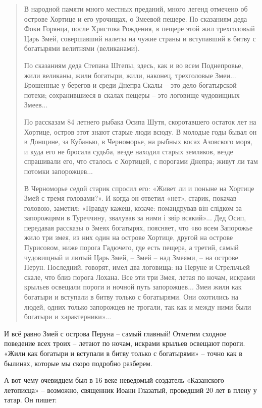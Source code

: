 \begin{quotation}
В народной памяти много местных преданий, много легенд отмечено об острове Хортице и его урочищах, о Змеевой пещере. По сказаниям деда Фоки Горянца, после Христова Рождения, в пещере этой жил трехголовый Царь Змей, совершавший налеты на чужие страны и вступавший в битву с богатырями велитнями (великанами). 

По сказаниям деда Степана Штепы, здесь, как и во всем Поднепровье, жили великаны, жили богатыри, жили, наконец, трехголовые Змеи... Брошенные у берегов и среди Днепра Скалы – это дело богатырской потехи; сохранившиеся в скалах пещеры – это логовище чудовищных Змеев...

По рассказам 84 летнего рыбака Осипа Шутя, скоротавшего остаток лет на Хортице, остров этот знают старые люди всюду. В молодые годы бывал он в Донщине, за Кубанью, в Черноморье, на рыбных косах Азовского моря, и куда его не бросала судьба, везде находил старых земляков, везде спрашивали его, что сталось с Хортицей, с порогами Днепра; живут ли там потомки запорожцев...

В Черноморье седой старик спросил его: «Живет ли и поныне на Хортице Змей с тремя головами?». И когда он ответил «нет», старик, покачав головою, заметил: «Правду кажеш, козаче: помандрував він слідком за запорожцями в Туреччину, звалував за ними і звір всякий»... Дед Осип, передавая рассказы о Змеях богатырях, поясняет, что «во всем Запорожье жило три змея, из них один на острове Хортице, другой на острове Пурисовом, ниже порога Гадючего, где есть пещера, а третий, самый чудовищный и лютый Царь Змей, – Змей – над Змеями, – на острове Перун. Последний, говорят, имел два логовища: на Перуне и Стрельчьей скале, что близ порога Лохана. Все эти три Змея, летая по ночам, искрами крыльев освещали пороги и ночной путь запорожцев... Змеи жили как богатыри и вступали в битву только с богатырями. Они охотились на людей, одних только запорожцев не трогали, так как и между ними были богатыри и характерники»...
\end{quotation}

И всё равно Змей с острова Перуна – самый главный! Отметим сходное поведение всех троих – летают по ночам, искрами крыльев освещают пороги. «Жили как богатыри и вступали в битву только с богатырями» – точно как в былинах, которые мы скоро подробно разберем.

А вот чему очевидцем был в 16 веке неведомый создатель «Казанского летописца» – возможно, священник Иоанн Глазатый, проведший 20 лет в плену у татар. Он пишет\cite[стр. 67]{kazanletop}:

